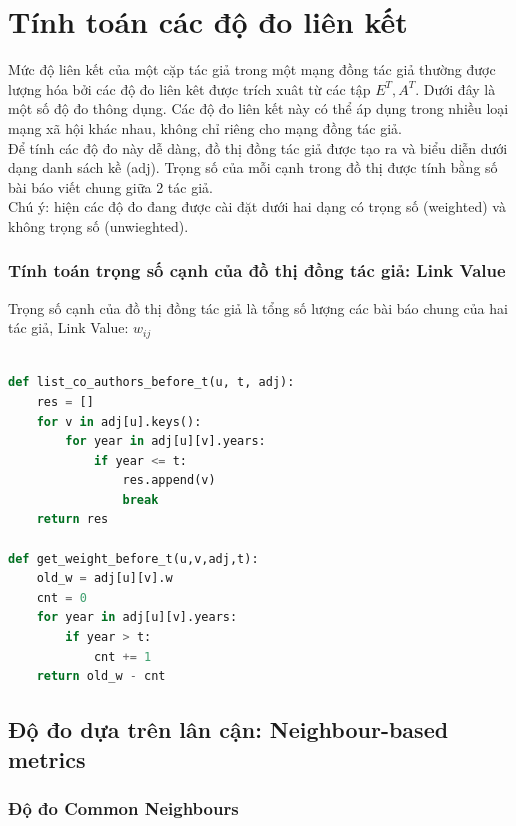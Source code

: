 \documentclass{article}
\begin{document}
\section{Tính toán các độ đo liên kết}

\indent Mức độ liên kết của một cặp tác giả trong một mạng đồng tác giả thường được lượng hóa bởi các độ đo liên kêt được trích xuât từ các tập $E^T, A^T$. Dưới đây là một số độ đo thông dụng. Các độ đo liên kết này có thể áp dụng trong nhiều loại mạng xã hội khác nhau, không chỉ riêng cho mạng đồng tác giả. \\

\indent Để tính các độ đo này dễ dàng, đồ thị đồng tác giả được tạo ra và biểu diễn dưới dạng danh sách kề (adj). Trọng số của mỗi cạnh trong đồ thị được tính bằng số bài báo viết chung giữa 2 tác giả. \\

\noindent Chú ý: hiện các độ đo đang được cài đặt dưới hai dạng có trọng số (weighted) và không trọng số (unwieghted).

\subsubsection{Tính toán trọng số cạnh của đồ thị đồng tác giả: Link Value}

\indent Trọng số cạnh của đồ thị đồng tác giả là tổng số lượng các bài báo chung của hai tác giả, Link Value:  $w_{ij}$

\begin{lstlisting}[language=Python, caption=Trọng số của đồ thị đồng tác giả]

def list_co_authors_before_t(u, t, adj):
    res = []
    for v in adj[u].keys():
        for year in adj[u][v].years:
            if year <= t:
                res.append(v)
                break
    return res

def get_weight_before_t(u,v,adj,t):
    old_w = adj[u][v].w
    cnt = 0
    for year in adj[u][v].years:
        if year > t: 
            cnt += 1
    return old_w - cnt

\end{lstlisting}

\subsection{Độ đo dựa trên lân cận: Neighbour-based metrics}

\subsubsection{Độ đo Common Neighbours}
\end{document}
